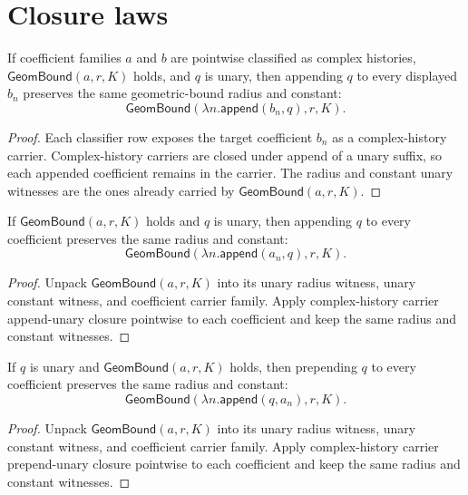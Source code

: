 \section{Closure laws}

\begin{lemma}
\label{thm:geom-bound-coeff-classifier-append-unary-closed}
If coefficient families $a$ and $b$ are pointwise classified as complex
histories, $\mathsf{GeomBound}(a,r,K)$ holds, and $q$ is unary, then appending
$q$ to every displayed $b_n$ preserves the same geometric-bound radius and
constant:
$$
\mathsf{GeomBound}(\lambda n.\mathsf{append}(b_n,q),r,K).
$$
\end{lemma}
\begin{proof}
Each classifier row exposes the target coefficient $b_n$ as a complex-history
carrier. Complex-history carriers are closed under append of a unary suffix, so
each appended coefficient remains in the carrier. The radius and constant
unary witnesses are the ones already carried by $\mathsf{GeomBound}(a,r,K)$.
\end{proof}

\begin{lemma}
\label{thm:geom-bound-append-unary-coeff-closed}
If $\mathsf{GeomBound}(a,r,K)$ holds and $q$ is unary, then appending $q$ to
every coefficient preserves the same radius and constant:
$$
\mathsf{GeomBound}(\lambda n.\mathsf{append}(a_n,q),r,K).
$$
\end{lemma}
\begin{proof}
Unpack $\mathsf{GeomBound}(a,r,K)$ into its unary radius witness, unary constant
witness, and coefficient carrier family. Apply complex-history carrier
append-unary closure pointwise to each coefficient and keep the same radius and
constant witnesses.
\end{proof}

\begin{lemma}
\label{thm:geom-bound-prepend-unary-coeff-closed}
If $q$ is unary and $\mathsf{GeomBound}(a,r,K)$ holds, then prepending $q$ to
every coefficient preserves the same radius and constant:
$$
\mathsf{GeomBound}(\lambda n.\mathsf{append}(q,a_n),r,K).
$$
\end{lemma}
\begin{proof}
Unpack $\mathsf{GeomBound}(a,r,K)$ into its unary radius witness, unary constant
witness, and coefficient carrier family. Apply complex-history carrier
prepend-unary closure pointwise to each coefficient and keep the same radius
and constant witnesses.
\end{proof}

